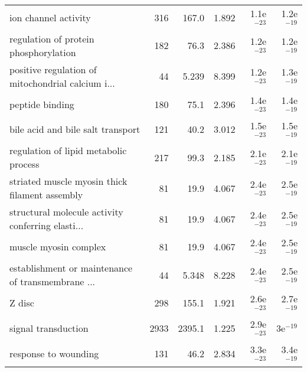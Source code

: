 \begin{longtable}{lrrrrr}
                              ion channel activity &                     316 &                   167.0 &      1.892 &         1.1e$^{-23}$ &         1.2e$^{-19}$ \\
             regulation of protein phosphorylation &                     182 &                    76.3 &      2.386 &         1.2e$^{-23}$ &         1.2e$^{-19}$ \\
 positive regulation of mitochondrial calcium i... &                      44 &                   5.239 &      8.399 &         1.2e$^{-23}$ &         1.3e$^{-19}$ \\
                                   peptide binding &                     180 &                    75.1 &      2.396 &         1.4e$^{-23}$ &         1.4e$^{-19}$ \\
                 bile acid and bile salt transport &                     121 &                    40.2 &      3.012 &         1.5e$^{-23}$ &         1.5e$^{-19}$ \\
             regulation of lipid metabolic process &                     217 &                    99.3 &      2.185 &         2.1e$^{-23}$ &         2.1e$^{-19}$ \\
    striated muscle myosin thick filament assembly &                      81 &                    19.9 &      4.067 &         2.4e$^{-23}$ &         2.5e$^{-19}$ \\
 structural molecule activity conferring elasti... &                      81 &                    19.9 &      4.067 &         2.4e$^{-23}$ &         2.5e$^{-19}$ \\
                             muscle myosin complex &                      81 &                    19.9 &      4.067 &         2.4e$^{-23}$ &         2.5e$^{-19}$ \\
 establishment or maintenance of transmembrane ... &                      44 &                   5.348 &      8.228 &         2.4e$^{-23}$ &         2.5e$^{-19}$ \\
                                            Z disc &                     298 &                   155.1 &      1.921 &         2.6e$^{-23}$ &         2.7e$^{-19}$ \\
                               signal transduction &                    2933 &                  2395.1 &      1.225 &         2.9e$^{-23}$ &           3e$^{-19}$ \\
                              response to wounding &                     131 &                    46.2 &      2.834 &         3.3e$^{-23}$ &         3.4e$^{-19}$ \\

\end{longtable}
